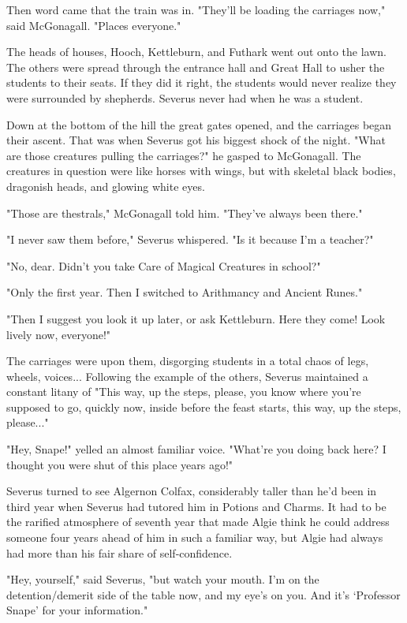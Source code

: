 Then word came that the train was in. "They'll be loading the carriages now," said McGonagall. "Places everyone."

The heads of houses, Hooch, Kettleburn, and Futhark went out onto the lawn. The others were spread through the entrance hall and Great Hall to usher the students to their seats. If they did it right, the students would never realize they were surrounded by shepherds. Severus never had when he was a student.

Down at the bottom of the hill the great gates opened, and the carriages began their ascent. That was when Severus got his biggest shock of the night. "What are those creatures pulling the carriages?" he gasped to McGonagall. The creatures in question were like horses with wings, but with skeletal black bodies, dragonish heads, and glowing white eyes.

"Those are thestrals," McGonagall told him. "They've always been there."

"I never saw them before," Severus whispered. "Is it because I'm a teacher?"

"No, dear. Didn't you take Care of Magical Creatures in school?"

"Only the first year. Then I switched to Arithmancy and Ancient Runes."

"Then I suggest you look it up later, or ask Kettleburn. Here they come! Look lively now, everyone!"

The carriages were upon them, disgorging students in a total chaos of legs, wheels, voices... Following the example of the others, Severus maintained a constant litany of "This way, up the steps, please, you know where you're supposed to go, quickly now, inside before the feast starts, this way, up the steps, please..."

"Hey, Snape!" yelled an almost familiar voice. "What're you doing back here? I thought you were shut of this place years ago!"

Severus turned to see Algernon Colfax, considerably taller than he'd been in third year when Severus had tutored him in Potions and Charms. It had to be the rarified atmosphere of seventh year that made Algie think he could address someone four years ahead of him in such a familiar way, but Algie had always had more than his fair share of self-confidence.

"Hey, yourself," said Severus, "but watch your mouth. I'm on the detention\slash demerit side of the table now, and my eye's on you. And it's `Professor Snape' for your information."


